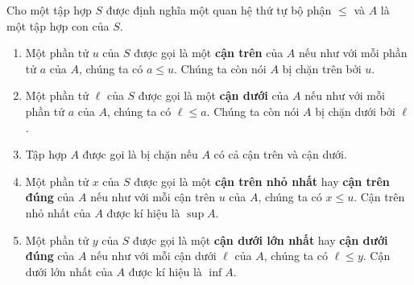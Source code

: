 \begin{definition}
    Cho một tập hợp $S$ được định nghĩa một quan hệ thứ tự bộ phận $\leq$ và $A$ là một tập hợp con của $S$.
    \begin{enumerate}[label={(\roman*)}]
        \item Một phần tử $u$ của $S$ được gọi là một \textbf{cận trên} của $A$ nếu như với mỗi phần tử $a$ của $A$, chúng ta có $a\leq u$. Chúng ta còn nói $A$ bị chặn trên bởi $u$.
        \item Một phần tử $\ell$ của $S$ được gọi là một \textbf{cận dưới} của $A$ nếu như với mỗi phần tử $a$ của $A$, chúng ta có $\ell\leq a$. Chúng ta còn nói $A$ bị chặn dưới bởi $\ell$.
        \item Tập hợp $A$ được gọi là bị chặn nếu $A$ có cả cận trên và cận dưới.
        \item Một phần tử $x$ của $S$ được gọi là một \textbf{cận trên nhỏ nhất} hay \textbf{cận trên đúng} của $A$ nếu như với mỗi cận trên $u$ của $A$, chúng ta có $x\leq u$. Cận trên nhỏ nhất của $A$ được kí hiệu là $\sup A$.
        \item Một phần tử $y$ của $S$ được gọi là một \textbf{cận dưới lớn nhất} hay \textbf{cận dưới đúng} của $A$ nếu như với mỗi cận dưới $\ell$ của $A$, chúng ta có $\ell\leq y$. Cận dưới lớn nhất của $A$ được kí hiệu là $\inf A$.
    \end{enumerate}
\end{definition}

